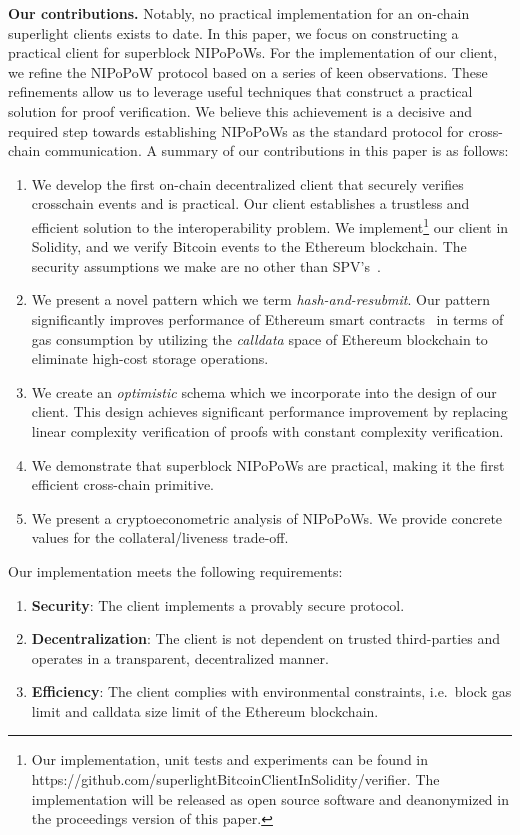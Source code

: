 \noindent
\textbf{Our contributions.}
Notably, no practical implementation for an on-chain superlight
clients exists to date. In this paper, we focus on constructing a practical
client for superblock NIPoPoWs.
For the implementation of our client, we refine the
NIPoPoW protocol based on a series of keen observations. These refinements
allow us to leverage useful techniques that construct a practical solution for
proof verification. We believe this achievement is a decisive and required step towards
establishing NIPoPoWs as the standard protocol for cross-chain communication.
A summary of our contributions in this paper is as follows:
\begin{enumerate}
\item We develop the first on-chain decentralized client that securely verifies
crosschain events and is practical. Our client establishes a trustless and
efficient solution to the interoperability problem. We implement\footnote{Our
implementation, unit tests and experiments can be found in https://github.com/superlightBitcoinClientInSolidity/verifier. The implementation will be released as open source software and deanonymized
in the proceedings version of this paper.} our client
in Solidity, and we verify Bitcoin events to the Ethereum blockchain. The
security assumptions we make are no other than
SPV's~\cite{eclipse, eclipse-ethereum}.
\item We present a novel pattern which we term \emph{hash-and-resubmit}. Our
pattern significantly improves performance of Ethereum smart
contracts~\cite{wood, buterin} in terms of gas consumption by utilizing the
\emph{calldata} space of Ethereum blockchain to eliminate high-cost storage
operations.
\item We create an \emph{optimistic} schema which we incorporate into the design
of our client. This design achieves significant performance improvement by
replacing linear complexity verification of proofs with constant complexity
verification.
\item We demonstrate that superblock NIPoPoWs are practical,
making it the first efficient cross-chain primitive.
\item We present a cryptoeconometric analysis of NIPoPoWs.
We provide concrete values for the collateral/liveness trade-off.
\end{enumerate}

Our implementation meets the following requirements:
\begin{enumerate}
\item \textbf{Security}: The client implements a provably secure protocol.
\item \textbf{Decentralization}: The client is not dependent on trusted third-parties
and operates in a transparent, decentralized manner.
\item \textbf{Efficiency}: The client complies with environmental constraints, i.e.\
block gas limit and calldata size limit of the Ethereum blockchain.
\end{enumerate}

